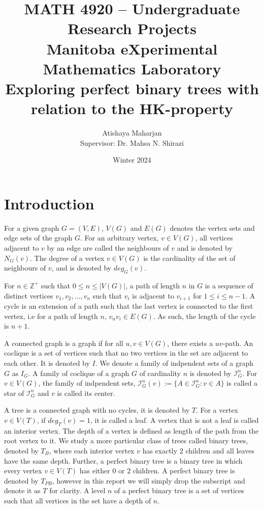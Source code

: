 \documentclass[11pt,a4paper]{article}
\title{MATH 4920 -- Undergraduate Research Projects\\
{\small{Manitoba eXperimental Mathematics Laboratory}}\\
\vspace{3mm}
\textbf{Exploring perfect binary trees with relation to the HK-property}}
\author{Atishaya Maharjan\\
Supervisor: Dr. Mahsa N. Shirazi\\
}
\date{Winter 2024}
\theoremstyle{definition}
\begin{document}
\maketitle

\section{Introduction}

For a given graph $G = (V,E)$, $V(G)$ and $E(G)$ denotes the vertex sets and edge sets of the graph $G$. For an arbitrary vertex, $v \in V(G)$, all vertices adjacent to $v$ by an edge are called the neighbours of $v$ and is denoted by $N_G(v)$. The degree of a vertex $v \in V(G)$ is the cardinality of the set of neighbours of $v$, and is denoted by $deg_G(v)$.

For $n \in \mathbb{Z^+}$ such that  $0 \leq n \leq |V(G)|$, a path of length $n$ in $G$ is a sequence of distinct vertices $v_1, v_2, \ldots, v_n$ such that $v_i$ is adjacent to $v_{i+1}$ for $1 \leq i \leq n-1$. A cycle is an extension of a path such that the last vertex is connected to the first vertex, i.e for a path of length $n$, $v_nv_i \in E(G)$. As such, the length of the cycle is $n + 1$.

A connected graph is a graph if for all $u,v \in V(G)$, there exists a $uv$-path. An coclique is a set of vertices such that no two vertices in the set are adjacent to each other. It is denoted by $I$. We denote a family of indpendent sets of a graph $G$ as $I_G$. A family of coclique of a graph $G$ of cardinality $n$ is denoted by $\mathcal{I}^n_G$. For $v \in V(G)$, the family of indpendent sets, $\mathcal{I}^n_G(v) := \{A \in \mathcal{I}^n_G : v \in A\}$ is called a star of $\mathcal{I}^n_G$ and $v$ is called its center.

A tree is a connected graph with no cycles, it is denoted by $T$. For a vertex $v \in V(T)$, if $deg_T(v) = 1$, it is called a leaf. A vertex that is not a leaf is called an interior vertex. The depth of a vertex is defined as length of the path from the root vertex to it. We study a more particular class of trees called binary trees, denoted by $T_B$, where each interior vertex $v$ has exactly $2$ children and all leaves have the same depth. Further, a perfect binary tree is a binary tree in which every vertex $v \in V(T)$ has either $0$ or $2$ children. A perfect binary tree is denoted by $T_{PB}$, however in this report we will simply drop the subscript and denote it as $T$ for clarity. A level $n$ of a perfect binary tree is a set of vertices such that all vertices in the set have a depth of $n$.
\end{document}
